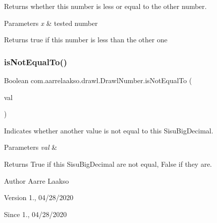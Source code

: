 Returns whether this number is less or equal to the other number. 


\begin{DoxyParams}{Parameters}
{\em x} & tested number \\
\hline
\end{DoxyParams}
\begin{DoxyReturn}{Returns}
true if this number is less than the other one 
\end{DoxyReturn}
\mbox{\label{classcom_1_1aarrelaakso_1_1drawl_1_1_drawl_number_aab6723b4f59ce1f72f50b6104a598c13}} 
\subsubsection{\texorpdfstring{is\+Not\+Equal\+To()}{isNotEqualTo()}}
{\footnotesize\ttfamily Boolean com.\+aarrelaakso.\+drawl.\+Drawl\+Number.\+is\+Not\+Equal\+To (\begin{DoxyParamCaption}\item[{\hyperlink{classcom_1_1aarrelaakso_1_1drawl_1_1_drawl_number}{Drawl\+Number}}]{val }\end{DoxyParamCaption})\hspace{0.3cm}{\ttfamily [protected]}}



Indicates whether another value is not equal to this Sisu\+Big\+Decimal. 


\begin{DoxyParams}{Parameters}
{\em val} & \\
\hline
\end{DoxyParams}
\begin{DoxyReturn}{Returns}
True if this Sisu\+Big\+Decimal are not equal, False if they are. 
\end{DoxyReturn}
\begin{DoxyAuthor}{Author}
Aarre Laakso 
\end{DoxyAuthor}
\begin{DoxyVersion}{Version}
1., 04/28/2020 
\end{DoxyVersion}
\begin{DoxySince}{Since}
1., 04/28/2020 
\end{DoxySince}
\mbox{\label{classcom_1_1aarrelaakso_1_1drawl_1_1_drawl_number_a8793a92d7875d105bc793f201f8b08d6}} 
